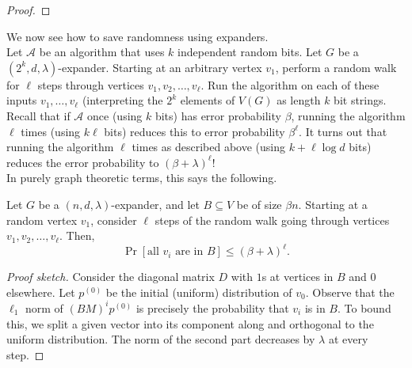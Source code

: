 \begin{proof}
			\end{proof}

			We now see how to save randomness using expanders.\\
			Let $\mathcal{A}$ be an algorithm that uses $k$ independent random bits. Let $G$ be a $(2^k,d,\lambda)$-expander. Starting at an arbitrary vertex $v_1$, perform a random walk for $\ell$ steps through vertices $v_1,v_2,\ldots,v_{\ell}$. Run the algorithm on each of these inputs $v_1,\ldots,v_{\ell}$ (interpreting the $2^k$ elements of $V(G)$ as length $k$ bit strings.\\
			Recall that if $\mathcal{A}$ once (using $k$ bits) has error probability $\beta$, running the algorithm $\ell$ times (using $k\ell$ bits) reduces this to error probability $\beta^\ell$. It turns out that running the algorithm $\ell$ times as described above (using $k+\ell\log d$ bits) reduces the error probability to $(\beta+\lambda)^{\ell}$!\\
			In purely graph theoretic terms, this says the following.

			\begin{ftheo}
				Let $G$ be a $(n,d,\lambda)$-expander, and let $B \subseteq V$ be of size $\beta n$. Starting at a random vertex $v_1$, consider $\ell$ steps of the random walk going through vertices $v_1,v_2,\ldots,v_{\ell}$. Then,
				\[ \Pr \left[ \text{all $v_i$ are in $B$} \right] \le (\beta+\lambda)^\ell. \]
			\end{ftheo}
			\begin{proof}[Proof sketch]
				Consider the diagonal matrix $D$ with $1$s at vertices in $B$ and $0$ elsewhere. Let $p^{(0)}$ be the initial (uniform) distribution of $v_0$. Observe that the $\ell_1$ norm of $(BM)^{i} p^{(0)}$ is precisely the probability that $v_i$ is in $B$. To bound this, we split a given vector into its component along and orthogonal to the uniform distribution. The norm of the second part decreases by $\lambda$ at every step.
			\end{proof}

